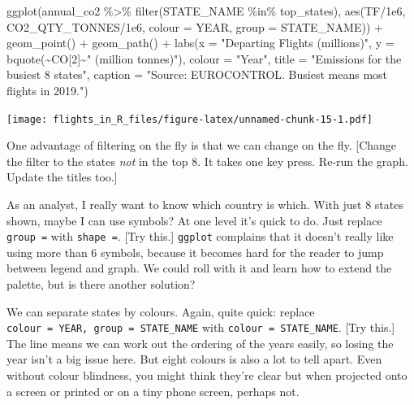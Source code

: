 \documentclass[
]{book}
\newenvironment{Shaded}{\begin{snugshade}}{\end{snugshade}}
\newcommand{\AttributeTok}[1]{\textcolor[rgb]{0.77,0.63,0.00}{#1}}
\newcommand{\DecValTok}[1]{\textcolor[rgb]{0.00,0.00,0.81}{#1}}
\newcommand{\FloatTok}[1]{\textcolor[rgb]{0.00,0.00,0.81}{#1}}
\newcommand{\FunctionTok}[1]{\textcolor[rgb]{0.00,0.00,0.00}{#1}}
\newcommand{\NormalTok}[1]{#1}
\newcommand{\SpecialCharTok}[1]{\textcolor[rgb]{0.00,0.00,0.00}{#1}}
\newcommand{\StringTok}[1]{\textcolor[rgb]{0.31,0.60,0.02}{#1}}
\begin{document}
\begin{Shaded}
\begin{Highlighting}[]
\FunctionTok{ggplot}\NormalTok{(annual\_co2 }\SpecialCharTok{\%\textgreater{}\%} 
         \FunctionTok{filter}\NormalTok{(STATE\_NAME }\SpecialCharTok{\%in\%}\NormalTok{ top\_states), }
       \FunctionTok{aes}\NormalTok{(TF}\SpecialCharTok{/}\FloatTok{1e6}\NormalTok{, CO2\_QTY\_TONNES}\SpecialCharTok{/}\FloatTok{1e6}\NormalTok{, }
           \AttributeTok{colour =}\NormalTok{ YEAR, }\AttributeTok{group =}\NormalTok{ STATE\_NAME)) }\SpecialCharTok{+}
  \FunctionTok{geom\_point}\NormalTok{() }\SpecialCharTok{+} 
  \FunctionTok{geom\_path}\NormalTok{() }\SpecialCharTok{+}
  \FunctionTok{labs}\NormalTok{(}\AttributeTok{x =} \StringTok{"Departing Flights (millions)"}\NormalTok{, }
       \AttributeTok{y =} \FunctionTok{bquote}\NormalTok{(}\SpecialCharTok{\textasciitilde{}}\NormalTok{CO[}\DecValTok{2}\NormalTok{]}\SpecialCharTok{\textasciitilde{}}\StringTok{" (million tonnes)"}\NormalTok{),}
       \AttributeTok{colour =} \StringTok{"Year"}\NormalTok{,}
       \AttributeTok{title =} \StringTok{"Emissions for the busiest 8 states"}\NormalTok{,}
       \AttributeTok{caption =} \StringTok{"Source: EUROCONTROL. \textquotesingle{}Busiest\textquotesingle{} means most flights in 2019."}\NormalTok{)}
\end{Highlighting}
\end{Shaded}

\texttt{[image: flights\_in\_R\_files/figure-latex/unnamed-chunk-15-1.pdf]}

One advantage of filtering on the fly is that we can change on the fly. {[}Change the filter to the states \emph{not} in the top 8. It takes one key press. Re-run the graph. Update the titles too.{]}

As an analyst, I really want to know which country is which. With just 8 states shown, maybe I can use symbols? At one level it's quick to do. Just replace \texttt{group\ =} with \texttt{shape\ =}. {[}Try this.{]} \texttt{ggplot} complains that it doesn't really like using more than 6 symbols, because it becomes hard for the reader to jump between legend and graph. We could roll with it and learn how to extend the palette, but is there another solution?

We can separate states by colours. Again, quite quick: replace \texttt{colour\ =\ YEAR,\ group\ =\ STATE\_NAME} with \texttt{colour\ =\ STATE\_NAME}. {[}Try this.{]} The line means we can work out the ordering of the years easily, so losing the year isn't a big issue here. But eight colours is also a lot to tell apart. Even without colour blindness, you might think they're clear but when projected onto a screen or printed or on a tiny phone screen, perhaps not.
\end{document}
